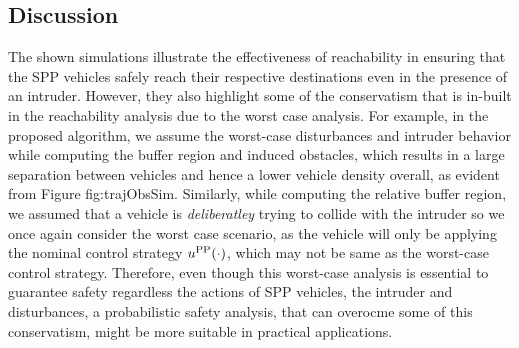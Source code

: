 \subsection{Discussion \label{sec:discuss}}
The shown simulations illustrate the effectiveness of reachability in ensuring that the SPP vehicles safely reach their respective destinations even in the presence of an intruder. However, they also highlight some of the conservatism that is in-built in the reachability analysis due to the worst case analysis. For example, in the proposed algorithm, we assume the worst-case disturbances and intruder behavior while computing the buffer region and induced obstacles, which results in a large separation between vehicles and hence a lower vehicle density overall, as evident from Figure {fig:trajObsSim}. Similarly, while computing the relative buffer region, we assumed that a vehicle is \textit{deliberatley} trying to collide with the intruder so we once again consider the worst case scenario, as the vehicle will only be applying the nominal control strategy $u^{\text{PP}}(\cdot)$, which may not be same as the worst-case control strategy. Therefore, even though this worst-case analysis is essential to guarantee safety regardless the actions of SPP vehicles, the intruder and disturbances, a probabilistic safety analysis, that can overocme some of this conservatism, might be more suitable in practical applications.